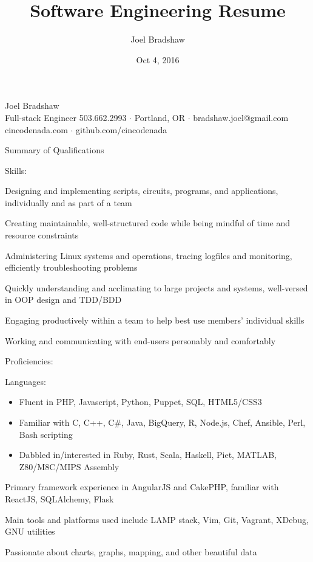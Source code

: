 \documentclass[letterpaper,10pt]{article}
\begin{document}
\title{Software Engineering Resume}
\author{Joel Bradshaw}
\date{Oct 4, 2016}
\begin{center}
{\Huge Joel Bradshaw}\\
\vskip 2pt
{\large Full-stack Engineer}
\vskip 4pt
{\large
    503.662.2993 \ensuremath{\cdot} Portland, OR \ensuremath{\cdot} bradshaw.joel@gmail.com\\
    cincodenada.com \ensuremath{\cdot} github.com/cincodenada}
\end{center}
\vskip -8pt

\begin{res_section}{Summary of Qualifications}
\begin{res_subsection}{Skills:}
  \item Designing and implementing scripts, circuits, programs, and applications, individually and as part of a team
  \item Creating maintainable, well-structured code while being mindful of time and resource constraints
  \item Administering Linux systems and operations, tracing logfiles and monitoring, efficiently troubleshooting problems
  \item Quickly understanding and acclimating to large projects and systems, well-versed in OOP design and TDD/BDD
  \item Engaging productively within a team to help best use members' individual skills
  \item Working and communicating with end-users personably and comfortably
\end{res_subsection}
\begin{res_subsection}{Proficiencies:}
  \item Languages:
  \def \multicolsep {0pt}
  \setlength{\columnsep}{-8pt}
  \begin{itemize}
    \item Fluent in PHP, Javascript, Python, Puppet, SQL, HTML5/CSS3
    \item Familiar with C, C++, C\#, Java, BigQuery, R, Node.js, Chef, Ansible, Perl, Bash scripting
    \item Dabbled in/interested in Ruby, Rust, Scala, Haskell, Piet, MATLAB, Z80/M8C/MIPS Assembly
  \end{itemize}
  \item Primary framework experience in AngularJS and CakePHP, familiar with ReactJS, SQLAlchemy, Flask
  \item Main tools and platforms used include LAMP stack, Vim, Git, Vagrant, XDebug, GNU utilities
  \item Passionate about charts, graphs, mapping, and other beautiful data
\end{res_subsection}
\end{res_section}
\end{document}
